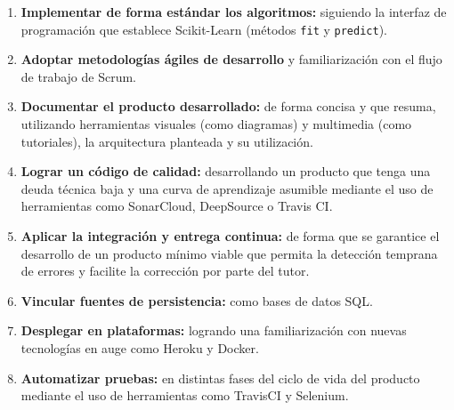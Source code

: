 \begin{enumerate}
	\item \textbf{Implementar de forma estándar los algoritmos:} siguiendo la interfaz de programación que establece Scikit-Learn (métodos \texttt{fit} y \texttt{predict}).
	\item \textbf{Adoptar metodologías ágiles de desarrollo} y familiarización con el flujo de trabajo de Scrum.
	\item \textbf{Documentar el producto desarrollado:} de forma concisa y que resuma, utilizando herramientas visuales (como diagramas) y multimedia (como tutoriales), la arquitectura planteada y su utilización.
	\item \textbf{Lograr un código de calidad:} desarrollando un producto que tenga una deuda técnica baja y una curva de aprendizaje asumible mediante el uso de herramientas como SonarCloud, DeepSource o Travis CI.
	\item \textbf{Aplicar la integración y entrega continua:} de forma que se garantice el desarrollo de un producto mínimo viable que permita la detección temprana de errores y facilite la corrección por parte del tutor.
	\item \textbf{Vincular fuentes de persistencia:} como bases de datos SQL.
	\item \textbf{Desplegar en plataformas:} logrando una familiarización con nuevas tecnologías en auge como Heroku y Docker.
	\item \textbf{Automatizar pruebas:} en distintas fases del ciclo de vida del producto mediante el uso de herramientas como TravisCI y Selenium.
	
\end{enumerate}